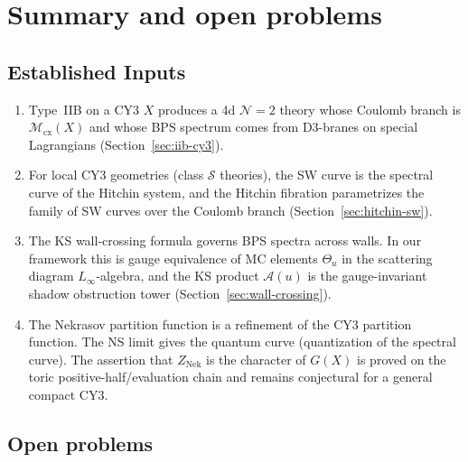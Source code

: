 \documentclass[11pt]{article}
\theoremstyle{definition}
\theoremstyle{remark}
\newcommand{\cM}{\mathcal{M}}
\newcommand{\cN}{\mathcal{N}}
\newcommand{\Nek}{\mathrm{Nek}}
\begin{document}
\section{Summary and open problems}
\label{sec:summary}

\subsection{Established Inputs}

\begin{enumerate}[label=(\arabic*)]
 \item Type~IIB on a CY3 $X$ produces a 4d $\cN=2$ theory whose Coulomb branch is $\cM_{\mathrm{cx}}(X)$
 and whose BPS spectrum comes from D3-branes on special Lagrangians (Section~\ref{sec:iib-cy3}).
 \item For local CY3 geometries (class $\mathcal{S}$ theories), the SW curve is the spectral
 curve of the Hitchin system, and the Hitchin fibration parametrizes the family of SW curves
 over the Coulomb branch (Section~\ref{sec:hitchin-sw}).
 \item The KS wall-crossing formula governs BPS spectra across walls. In our framework this is
 gauge equivalence of MC elements $\Theta_u$ in the scattering diagram $L_\infty$-algebra, and
 the KS product $\mathcal{A}(u)$ is the gauge-invariant shadow obstruction tower (Section~\ref{sec:wall-crossing}).
 \item The Nekrasov partition function is a refinement of the CY3 partition function. The NS
 limit gives the quantum curve (quantization of the spectral curve). The assertion that
 $Z_{\Nek}$ is the character of $G(X)$ is proved on the toric positive-half/evaluation chain
 and remains conjectural for a general compact CY3.
\end{enumerate}

\subsection{Open problems}
\label{subsec:open-problems}
\end{document}
